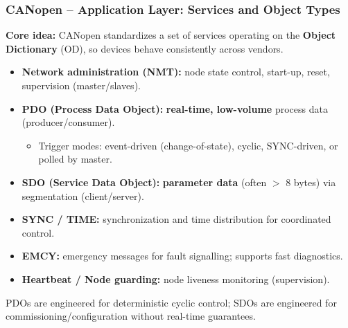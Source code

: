 \begin{frame}
	\frametitle{CANopen -- Application Layer: Services and Object Types}
	\small
	\textbf{Core idea:} CANopen standardizes a set of services operating on the \textbf{Object Dictionary} (OD),
	so devices behave consistently across vendors.
	\begin{itemize}
		\item \textbf{Network administration (NMT):} node state control, start-up, reset, supervision (master/slaves).
		\item \textbf{PDO (Process Data Object):} \textbf{real-time, low-volume} process data (producer/consumer).
		\begin{itemize}\footnotesize
			\item Trigger modes: event-driven (change-of-state), cyclic, SYNC-driven, or polled by master.
		\end{itemize}
		\item \textbf{SDO (Service Data Object):} \textbf{parameter data} (often $>$ 8 bytes) via segmentation (client/server).
		\item \textbf{SYNC / TIME:} synchronization and time distribution for coordinated control.
		\item \textbf{EMCY:} emergency messages for fault signalling; supports fast diagnostics.
		\item \textbf{Heartbeat / Node guarding:} node liveness monitoring (supervision).
	\end{itemize}
	\footnotesize
	PDOs are engineered for deterministic cyclic control; SDOs are engineered for commissioning/configuration without real-time guarantees.
\end{frame}


